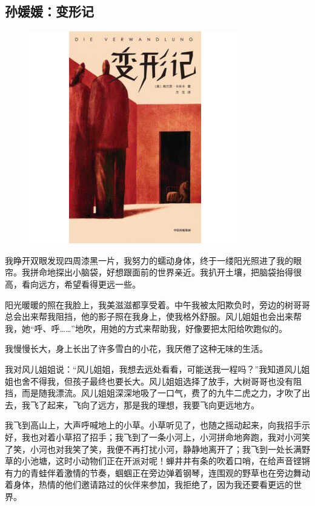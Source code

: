 \vspace{10pt}

{\centering\subsection*{孙媛媛：变形记}}


\renewcommand{\leftmark}{孙媛媛：变形记}

\begin{figure}[htbp]

\centering

\includegraphics[width = .5\textwidth]{./ch/34.jpg}

\end{figure}



我睁开双眼发现四周漆黑一片，我努力的蠕动身体，终于一缕阳光照进了我的眼帘。我拼命地探出小脑袋，好想跟面前的世界亲近。我扒开土壤，把脑袋抬得很高，看向远方，希望看得更远一些。



阳光暖暖的照在我脸上，我美滋滋都享受着。中午我被太阳欺负时，旁边的树哥哥总会出来帮我阻挡，他的影子照在我身上，使我格外舒服。风儿姐姐也会出来帮我，她“呼、呼……”地吹，用她的方式来帮助我，好像要把太阳给吹跑似的。



我慢慢长大，身上长出了许多雪白的小花，我厌倦了这种无味的生活。



我对风儿姐姐说：“风儿姐姐，我想去远处看看，可能送我一程吗？”我知道风儿姐姐也舍不得我，但孩子最终也要长大。风儿姐姐选择了放手，大树哥哥也没有阻挡，而是随我漂流。风儿姐姐深深地吸了一口气，费了的九牛二虎之力，才吹了出去，我飞了起来，飞向了远方，那是我的理想，我要飞向更远地方。



我飞到高山上，大声呼喊地上的小草。小草听见了，也随之摇动起来，向我招手示好，我也对着小草招了招手；我飞到了一条小河上，小河拼命地奔跑，我对小河笑了笑，小河也对我笑了笑，我便不再打扰小河，静静地离开了；我飞到一处长满野草的小池塘，这时小动物们正在开派对呢！蝉井井有条的吹着口哨，在给声音铿锵有力的青蛙伴着激情的节奏，蝈蝈正在旁边弹着钢琴，连围观的野草也在旁边舞动着身体，热情的他们邀请路过的伙伴来参加，我拒绝了，因为我还要看更远的世界。



